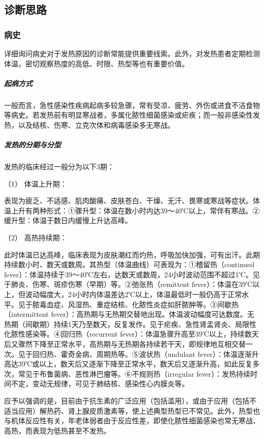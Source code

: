 \subsection{诊断思路}

\subsubsection{病史}

详细询问病史对于发热原因的诊断常能提供重要线索。此外，对发热患者定期检测体温，密切观察热度的高低、时限、热型等也有重要价值。

\subparagraph{起病方式}

一般而言，急性感染性疾病起病多较急骤，常有受凉、疲劳、外伤或进食不洁食物等病史。若发热前有明显寒战者，多属化脓性细菌感染或疟疾；而一般非感染性发热，以及结核、伤寒、立克次体和病毒感染多无寒战。

\subparagraph{发热的分期与分型}

发热的临床经过一般分为以下3期：

\hypertarget{text00008.htmlux5cux23CHP1-1-2-1-2-1}{}
（1） 体温上升期：

表现为疲乏、不适感、肌肉酸痛、皮肤苍白、干燥、无汗、畏寒或寒战等症状。体温上升有两种形式：①骤升型：体温在数小时内达39～40℃以上，常伴有寒战。②缓升型：体温于数日内缓慢上升达高峰。

\hypertarget{text00008.htmlux5cux23CHP1-1-2-1-2-2}{}
（2） 高热持续期：

此时体温已达高峰，临床表现为皮肤潮红而灼热，呼吸加快加强，可有出汗。此期持续数小时、数天或数周。其热型（体温曲线）可表现为：①稽留热（continued
fever）：体温持续于39～40℃左右，达数天或数周，24小时波动范围不超过1℃。见于肺炎、伤寒、斑疹伤寒（早期）等。②弛张热（remittent
fever）：体温在39℃以上，但波动幅度大，24小时内体温差达2℃以上，体温最低时一般仍高于正常水平。见于脓毒血症、风湿热、重症结核、化脓性炎症如肝脓肿等。③间歇热（intermittent
fever）：高热期与无热期交替地出现。体温波动幅度可达数度。无热期（间歇期）持续1天乃至数天，反复发作。见于疟疾、急性肾盂肾炎、局限性化脓性感染等。④回归热（recurrent
fever）：体温急骤升高至39℃以上，持续数天后又骤然下降至正常水平，高热期与无热期各持续若干天，即规律地互相交替一次。见于回归热、霍奇金病、周期热等。⑤波状热（undulant
fever）：体温逐渐升高达39℃或以上，数天后又逐渐下降至正常水平，数天后又逐渐升高，如此反复多次，常见于布鲁菌病、恶性淋巴瘤等。⑥不规则热（irregular
fever）：发热持续时间不定，变动无规律，可见于肺结核、感染性心内膜炎等。

应予以强调的是，目前由于抗生素的广泛应用（包括滥用），或由于应用（包括不适当应用）解热药、肾上腺皮质激素等，使上述典型热型已不常见。此外，热型也与机体反应性有关，年老体弱者由于反应性差，即使化脓性细菌感染也常无寒战、高热，而表现为低热甚至不发热。

